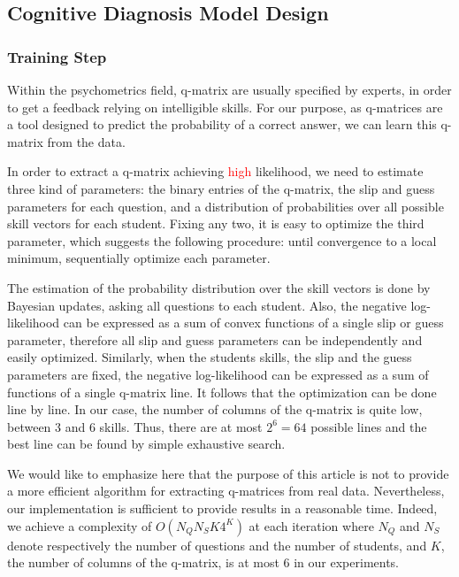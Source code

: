 \documentclass{sig-alternate}
\newcommand\alert[1]{\textcolor{red}{#1}}
\begin{document}
\subsection{Cognitive Diagnosis Model Design}

\subsubsection{Training Step}

Within the psychometrics field, q-matrix are usually specified by experts, in order to get a feedback relying on intelligible skills. For our purpose, as q-matrices are a tool designed to predict the probability of a correct answer, we can learn this q-matrix from the data.

In order to extract a q-matrix achieving \alert{high} likelihood, we need to estimate three kind of parameters: the binary entries of the q-matrix, the slip and guess parameters for each question, and a distribution of probabilities over all possible skill vectors for each student. Fixing any two, it is easy to optimize the third parameter, which suggests the following procedure: until convergence to a local minimum, sequentially optimize each parameter.

The estimation of the probability distribution over the skill vectors is done by Bayesian updates, asking all questions to each student. Also, the negative log-likelihood can be expressed as a sum of convex functions of a single slip or guess parameter, therefore all slip and guess parameters can be independently and easily optimized.  Similarly, when the students skills, the slip and the guess parameters are fixed, the negative log-likelihood can be expressed as a sum of functions of a single q-matrix line. It follows that the optimization can be done line by line. In our case, the number of columns of the q-matrix is quite low, between 3 and 6 skills. Thus, there are at most $2^6 = 64$ possible lines and the best line can be found by simple exhaustive search.


We would like to emphasize here that the purpose of this article is not to provide a more efficient algorithm for extracting q-matrices from real data. Nevertheless, our implementation is sufficient to provide results in a reasonable time. Indeed, we achieve a complexity of $O(N_Q N_S K 4^K)$ at each iteration where $N_Q$ and $N_S$ denote respectively the number of questions and the number of students, and $K$, the number of columns of the q-matrix, is at most 6 in our experiments.
\end{document}
